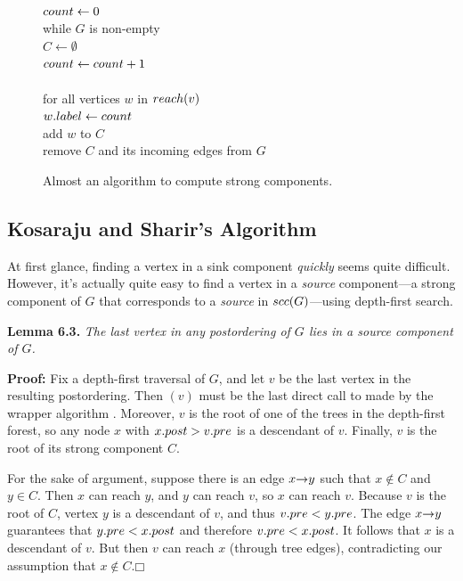 \begin{figure}[ht]
\centering
\begin{pseudocode}
\\
$count \gets 0$\\
while $G$ is non-empty\\
\Indent $C \gets \emptyset$\\
\Indent $count \gets count + 1$\\
 \\
\Indent for all vertices $w$ in $reach(v)$\\
\Indent\Indent $w.label \gets count$\\
\Indent\Indent add $w$ to $C$\\
\Indent remove $C$ and its incoming edges from $G$
\end{pseudocode}
\caption{Almost an algorithm to compute strong components.}
\label{fig:6.15}
\end{figure}

\subsection{Kosaraju and Sharir’s Algorithm}

At first glance, finding a vertex in a sink component \textit{quickly} seems quite difficult.
However, it’s actually quite easy to find a vertex in a \textit{source} component---a strong component of $G$ that corresponds to a \textit{source} in $scc(G)$---using depth-first search.

\medskip
\noindent\textbf{Lemma 6.3.} \textsl{The last vertex in any postordering of $G$ lies in a source component of $G$.}

\medskip
\noindent\textbf{Proof:} Fix a depth-first traversal of $G$, and let $v$ be the last vertex in the resulting postordering.
Then $(v)$ must be the last direct call to  made by the wrapper algorithm .
Moreover, $v$ is the root of one of the trees in the depth-first forest, so any node $x$ with $x.post > v.pre$ is a descendant of $v$.
Finally, $v$ is the root of its strong component $C$.

For the sake of argument, suppose there is an edge $x\mathord{\rightarrow}y$ such that $x \notin C$ and $y \in C$.
Then $x$ can reach $y$, and $y$ can reach $v$, so $x$ can reach $v$.
Because $v$ is the root of $C$, vertex $y$ is a descendant of $v$, and thus $v.pre < y.pre$.
The edge $x\mathord{\rightarrow}y$ guarantees that $y.pre < x.post$ and therefore $v.pre < x.post$.
It follows that $x$ is a descendant of $v$.
But then $v$ can reach $x$ (through tree edges), contradicting our assumption that $x \notin C$.\hfill$\mdlgwhtsquare$

